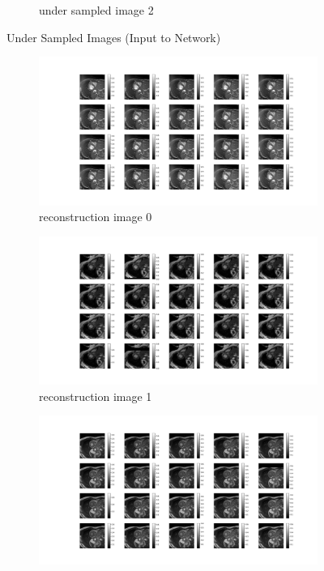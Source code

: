 \documentclass{article}
\begin{document}
\begin{figure}[ht]
\begin{subfigure}[b]{0.8\linewidth}
    \caption{under sampled image 2}
  \end{subfigure}
  \caption{Under Sampled Images (Input to Network)}
  \label{fig:under_sampled_no_opt}
\end{figure}

\begin{figure}[ht]
  \centering
  \begin{subfigure}[b]{0.8\linewidth}
    \includegraphics[width=\linewidth]{../images/No_opt/reconstruction/reconstruction_0.png}
    \caption{reconstruction image 0}
  \end{subfigure}
  \quad
  \begin{subfigure}[b]{0.8\linewidth}
    \includegraphics[width=\linewidth]{../images/No_opt/reconstruction/reconstruction_1.png}
    \caption{reconstruction image 1}
  \end{subfigure}
  \quad
  \begin{subfigure}[b]{0.8\linewidth}
    \includegraphics[width=\linewidth]{../images/No_opt/reconstruction/reconstruction_2.png}

\end{subfigure}
\end{figure}
\end{document}
